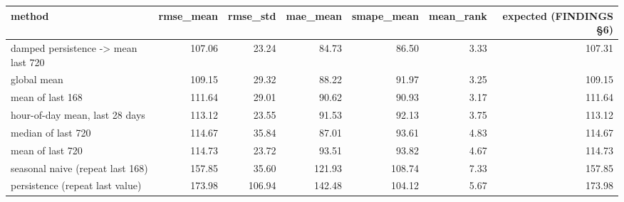 \begin{tabular}{lrrrrrr}
\toprule
method & rmse\_mean & rmse\_std & mae\_mean & smape\_mean & mean\_rank & expected (FINDINGS §6) \\
\midrule
damped persistence -> mean last 720 & 107.06 & 23.24 & 84.73 & 86.50 & 3.33 & 107.31 \\
global mean & 109.15 & 29.32 & 88.22 & 91.97 & 3.25 & 109.15 \\
mean of last 168 & 111.64 & 29.01 & 90.62 & 90.93 & 3.17 & 111.64 \\
hour-of-day mean, last 28 days & 113.12 & 23.55 & 91.53 & 92.13 & 3.75 & 113.12 \\
median of last 720 & 114.67 & 35.84 & 87.01 & 93.61 & 4.83 & 114.67 \\
mean of last 720 & 114.73 & 23.72 & 93.51 & 93.82 & 4.67 & 114.73 \\
seasonal naive (repeat last 168) & 157.85 & 35.60 & 121.93 & 108.74 & 7.33 & 157.85 \\
persistence (repeat last value) & 173.98 & 106.94 & 142.48 & 104.12 & 5.67 & 173.98 \\
\bottomrule
\end{tabular}
